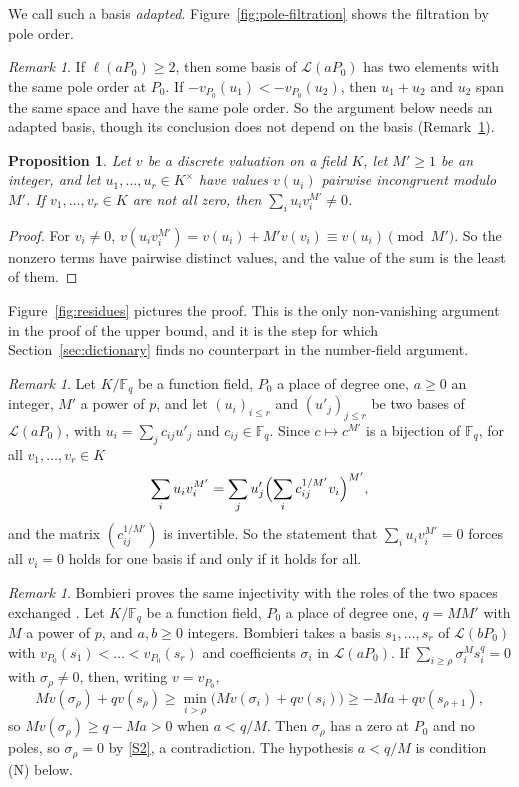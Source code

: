 \documentclass[11pt]{amsbook}
\theoremstyle{plain}
\newtheorem{proposition}[theorem]{Proposition}
\theoremstyle{definition}
\theoremstyle{remark}
\newtheorem{remark}[theorem]{Remark}
\numberwithin{equation}{section}
\numberwithin{figure}{chapter}
\numberwithin{table}{chapter}
\newcommand{\F}{\mathbb{F}}
\newcommand{\calL}{\mathcal{L}}
\begin{document}
We call such a basis \emph{adapted}. Figure~\ref{fig:pole-filtration}
shows the filtration by pole order.

\begin{remark}\label{rem:basis-cex}
If $\ell(aP_0)\ge2$, then some basis of $\calL(aP_0)$ has two
elements with the same pole order at $P_0$. If
$-v_{P_0}(u_1)<-v_{P_0}(u_2)$, then $u_1+u_2$ and $u_2$ span the
same space and have the same pole order. So the argument below
needs an adapted basis, though its conclusion does not depend on the
basis (Remark~\ref{rem:basis-free}).
\end{remark}

\begin{proposition}\label{prop:independence}
Let $v$ be a discrete valuation on a field $K$, let $M'\ge1$ be an
integer, and let $u_1,\dots,u_r\in K^\times$ have values $v(u_i)$
pairwise incongruent modulo $M'$. If $v_1,\dots,v_r\in K$ are not
all zero, then $\sum_iu_iv_i^{M'}\ne0$.
\end{proposition}

\begin{proof}
For $v_i\ne0$,
$v(u_iv_i^{M'})=v(u_i)+M'v(v_i)\equiv v(u_i)\pmod{M'}$. So the
nonzero terms have pairwise distinct values, and the value of the
sum is the least of them.
\end{proof}

Figure~\ref{fig:residues} pictures the proof. This is the only
non-vanishing argument in the proof of the upper bound, and it is
the step for which Section~\ref{sec:dictionary} finds no
counterpart in the number-field argument.

\begin{remark}\label{rem:basis-free}
Let $K/\F_q$ be a function field, $P_0$ a place of degree one,
$a\ge0$ an integer, $M'$ a power of $p$, and let
$(u_i)_{i\le r}$ and $(u'_j)_{j\le r}$ be two bases of
$\calL(aP_0)$, with $u_i=\sum_jc_{ij}u'_j$
and $c_{ij}\in\F_q$. Since $c\mapsto c^{M'}$ is a bijection of
$\F_q$, for all $v_1,\dots,v_r\in K$
\[
\sum_iu_iv_i^{M'}
=\sum_ju'_j\Bigl(\sum_ic_{ij}^{1/M'}v_i\Bigr)^{M'},
\]
and the matrix $(c_{ij}^{1/M'})$ is invertible. So the statement
that $\sum_iu_iv_i^{M'}=0$ forces all $v_i=0$ holds for one basis
if and only if it holds for all.
\end{remark}

\begin{remark}\label{rem:bombieri-injectivity}
Bombieri proves the same injectivity with the roles of the two
spaces exchanged \cite[pp.~236--237]{Bombieri1974}. Let $K/\F_q$
be a function field, $P_0$ a place of degree one, $q=MM'$ with $M$
a power of $p$, and $a,b\ge0$ integers. Bombieri takes a basis
$s_1,\dots,s_r$ of $\calL(bP_0)$ with
$v_{P_0}(s_1)<\dots<v_{P_0}(s_r)$ and coefficients $\sigma_i$ in
$\calL(aP_0)$. If $\sum_{i\ge\rho}\sigma_i^Ms_i^q=0$ with
$\sigma_\rho\ne0$, then, writing $v=v_{P_0}$,
\[
Mv(\sigma_\rho)+qv(s_\rho)
\ge\min_{i>\rho}\bigl(Mv(\sigma_i)+qv(s_i)\bigr)
\ge-Ma+qv(s_{\rho+1}),
\]
so $Mv(\sigma_\rho)\ge q-Ma>0$ when $a<q/M$. Then $\sigma_\rho$ has
a zero at $P_0$ and no poles, so $\sigma_\rho=0$ by \ref{S2}, a
contradiction. The hypothesis $a<q/M$ is condition (N) below.
\end{remark}
\end{document}
